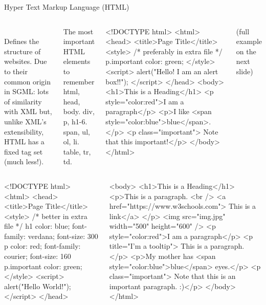 \begin{frame}{Hyper Text Markup Language (HTML)}
\small 

\begin{columns}
\\
Defines the structure of websites. Due to their common origin in SGML: lots of similarity with XML but, unlike XML's extensibility, HTML has a fixed tag set (much less!). 


\begin{block}{The most important HTML elements to remember }
html, head, body.
div, p, h1-6.
span,
ul, ol, li.
table, tr, td.
\end{block}

\begin{htmlcode}
<!DOCTYPE html>
<html>
 <head>
  <title>Page Title</title>
  <style> /* preferably in extra file */
   p.important {
    color: green;
    }
  </style>
  <script>
    alert("Hello! I am an alert box!!");
  </script>
 </head>
 <body>
  <h1>This is a Heading</h1>
  <p style="color:red">I am a paragraph</p>
  <p>I like
   <span style="color:blue">blue</span>.</p>
  <p class="important">
   Note that this important!</p>
  </body>
</html>
\end{htmlcode}
(full example on the next slide)
\end{columns}

\framebreak

\begin{columns}
\begin{htmlcode}
<!DOCTYPE html>
<html>
 <head>
  <title>Page Title</title>
  <style> /* better in extra file */
  h1 {
   color: blue;
   font-family: verdana;
   font-size: 300%
   }
   p  {
    color: red;
    font-family: courier;
    font-size: 160%
    }
   p.important {
    color: green;
    }
  </style>
  <script>
    alert("Hello World!");
   </script>
 </head>
\end{htmlcode}

\begin{htmlcode}
 <body>
  <h1>This is a Heading</h1>
  <p>This is a paragraph. <br />
    <a href="https://www.w3schools.com">
    This is a link</a>
  </p>
  <img src="img.jpg" 
    width="500" height="600" />
  <p style="color:red">I am a paragraph</p>
  <p title="I'm a tooltip">
    This is a paragraph.
  </p>
  <p>My mother has 
     <span style="color:blue">blue</span>
     eyes.</p>
  <p class="important">
    Note that this is an important 
    paragraph. :)</p>
 </body>
</html>
\end{htmlcode}
\end{columns}

\end{frame}

